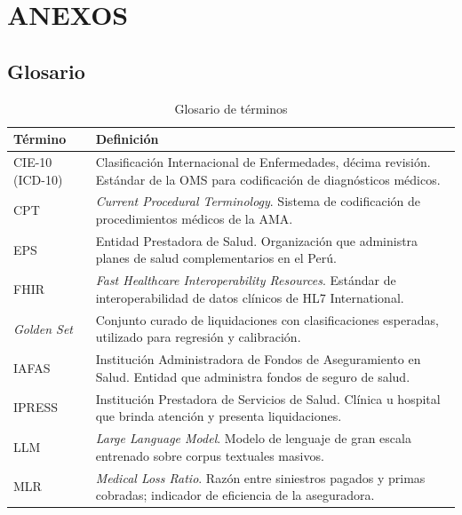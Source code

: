 \chapter{ANEXOS}

\section{Glosario}

\begin{table}[H]
\centering
\caption{Glosario de términos}
\label{tab:glosario}
\renewcommand{\arraystretch}{1.25}
\begin{tabularx}{\textwidth}{@{}p{}X@{}}
\toprule
\textbf{Término} & \textbf{Definición} \\
\midrule

CIE-10 (ICD-10) &
Clasificación Internacional de Enfermedades, décima revisión. Estándar de la OMS para codificación de diagnósticos médicos. \\

CPT &
\textit{Current Procedural Terminology}. Sistema de codificación de procedimientos médicos de la AMA. \\

EPS &
Entidad Prestadora de Salud. Organización que administra planes de salud complementarios en el Perú. \\

FHIR &
\textit{Fast Healthcare Interoperability Resources}. Estándar de interoperabilidad de datos clínicos de HL7 International. \\

\textit{Golden Set} &
Conjunto curado de liquidaciones con clasificaciones esperadas, utilizado para regresión y calibración. \\

IAFAS &
Institución Administradora de Fondos de Aseguramiento en Salud. Entidad que administra fondos de seguro de salud. \\

IPRESS &
Institución Prestadora de Servicios de Salud. Clínica u hospital que brinda atención y presenta liquidaciones. \\

LLM &
\textit{Large Language Model}. Modelo de lenguaje de gran escala entrenado sobre corpus textuales masivos. \\

MLR &
\textit{Medical Loss Ratio}. Razón entre siniestros pagados y primas cobradas; indicador de eficiencia de la aseguradora. \\


\end{tabularx}
\end{table}

